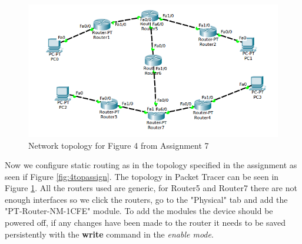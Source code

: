 \documentclass{article}
\begin{document}
\begin{figure}[h]
    \centering
    \includegraphics[scale=0.3]{4toppt}
    \caption{Network topology for Figure 4 from Assignment 7}
    \label{fig:4toppt}
\end{figure}
Now we configure static routing as in the topology specified in the assignment as seen if Figure 
\ref{fig:4topassign}. The topology in Packet Tracer can be seen in Figure \ref{fig:4toppt}. All the routers used are generic, for Router5 and Router7 there are not enough interfaces so we click the routers, go to the "Physical" tab and add the "PT-Router-NM-1CFE" module. To add the modules the device should be powered off, if any changes have been made to the router it needs to be saved persistently with the \textbf{write} command in the \textit{enable mode}. 
\end{document}
